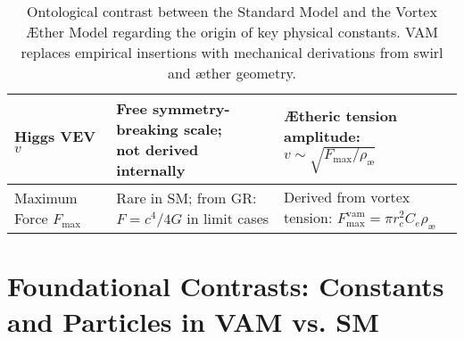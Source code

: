 \begin{table}[H]
\begin{tabular}{|l|l|l|}
        \makecell[l]{Higgs VEV \\ $v$} &
        \makecell[l]{Free symmetry-breaking scale; \\ not derived internally} &
        \makecell[l]{Ætheric tension amplitude: \\ $v \sim \sqrt{F_\text{max}/\rho_\text{\ae}}$} \\
        \hline

        \makecell[l]{Maximum \\ Force $F_\text{max}$} &
        \makecell[l]{Rare in SM; from GR: \\ $F = c^4/4G$ in limit cases} &
        \makecell[l]{Derived from vortex tension: \\ $F_\text{max}^{\text{vam}} = \pi r_c^2 C_e \rho_\text{\ae}$} \\
        \hline
    \end{tabular}
    \caption{Ontological contrast between the Standard Model and the Vortex Æther Model regarding the origin of key physical constants. VAM replaces empirical insertions with mechanical derivations from swirl and æther geometry.}
    \label{tab:SM_vs_VAM_constants}
\end{table}

\section*{Foundational Contrasts: Constants and Particles in VAM vs. SM}

